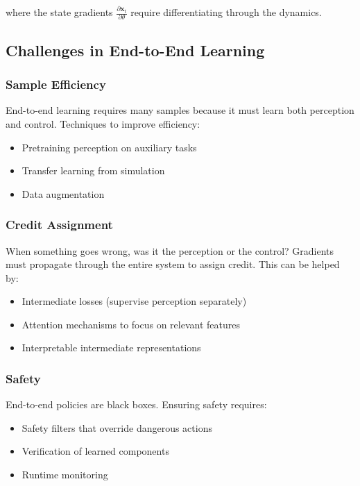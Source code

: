 where the state gradients $\frac{\partial \mathbf{x}_t}{\partial \theta}$ require differentiating through the dynamics.

\subsection{Challenges in End-to-End Learning}

\subsubsection{Sample Efficiency}

End-to-end learning requires many samples because it must learn both perception and control. Techniques to improve efficiency:
\begin{itemize}
    \item Pretraining perception on auxiliary tasks
    \item Transfer learning from simulation
    \item Data augmentation
\end{itemize}

\subsubsection{Credit Assignment}

When something goes wrong, was it the perception or the control? Gradients must propagate through the entire system to assign credit. This can be helped by:
\begin{itemize}
    \item Intermediate losses (supervise perception separately)
    \item Attention mechanisms to focus on relevant features
    \item Interpretable intermediate representations
\end{itemize}

\subsubsection{Safety}

End-to-end policies are black boxes. Ensuring safety requires:
\begin{itemize}
    \item Safety filters that override dangerous actions
    \item Verification of learned components
    \item Runtime monitoring
\end{itemize}

